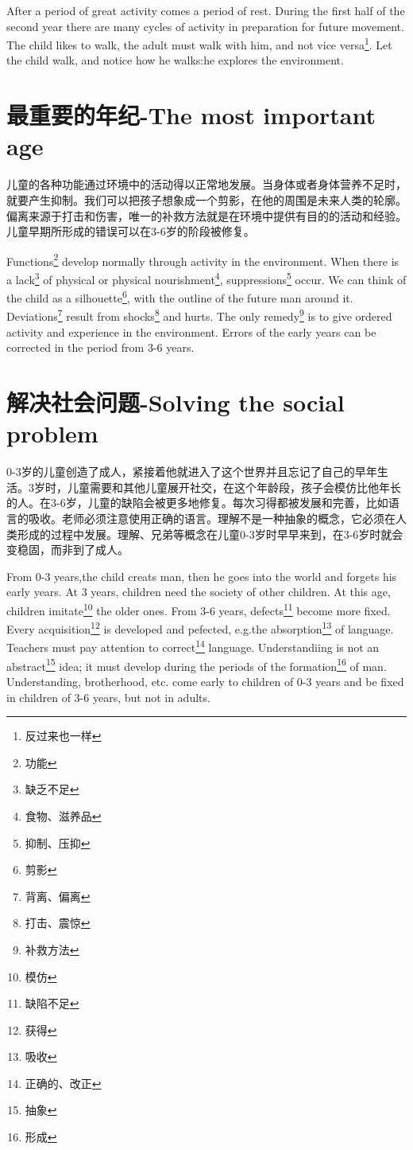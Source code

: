 \documentclass[lang=cn,10pt]{elegantbook}
\begin{document}
After a period of great activity comes a period of rest. During the first half of the second year there are many cycles of activity in preparation for future movement. The child likes to walk, the adult must walk with him, and not vice versa\footnote{反过来也一样}. Let the child walk, and notice how he walks:he explores the environment.

\chapter{最重要的年纪-The most important age}

儿童的各种功能通过环境中的活动得以正常地发展。当身体或者身体营养不足时，就要产生抑制。我们可以把孩子想象成一个剪影，在他的周围是未来人类的轮廓。偏离来源于打击和伤害，唯一的补救方法就是在环境中提供有目的的活动和经验。儿童早期所形成的错误可以在3-6岁的阶段被修复。

Functions\footnote{功能} develop normally through activity in the environment. When there is a lack\footnote{缺乏不足} of physical or physical nourishment\footnote{食物、滋养品}, suppressions\footnote{抑制、压抑} occur. We can think of the child as a silhouette\footnote{剪影}, with the outline of the future man around it. Deviations\footnote{背离、偏离} result from shocks\footnote{打击、震惊} and hurts. The only remedy\footnote{补救方法} is to give ordered activity and experience in the environment. Errors of the early years can be corrected in the period from 3-6 years.

\chapter{解决社会问题-Solving the social problem}

0-3岁的儿童创造了成人，紧接着他就进入了这个世界并且忘记了自己的早年生活。3岁时，儿童需要和其他儿童展开社交，在这个年龄段，孩子会模仿比他年长的人。在3-6岁，儿童的缺陷会被更多地修复。每次习得都被发展和完善，比如语言的吸收。老师必须注意使用正确的语言。理解不是一种抽象的概念，它必须在人类形成的过程中发展。理解、兄弟等概念在儿童0-3岁时早早来到，在3-6岁时就会变稳固，而非到了成人。

From 0-3 years,the child creats man, then he goes into the world and forgets his early years. At 3 years, children need the society of other children. At this age, children imitate\footnote{模仿} the older ones. From 3-6 years, defects\footnote{缺陷不足} become more fixed. Every acquisition\footnote{获得} is developed and pefected, e.g.the absorption\footnote{吸收} of language. Teachers must pay attention to correct\footnote{正确的、改正} language. Understandiing is not an abstract\footnote{抽象} idea; it must develop during the periods of the formation\footnote{形成} of man. Understanding, brotherhood, etc. come early to children of 0-3 years and be fixed in children of 3-6 years, but not in adults.
 
\end{document}
